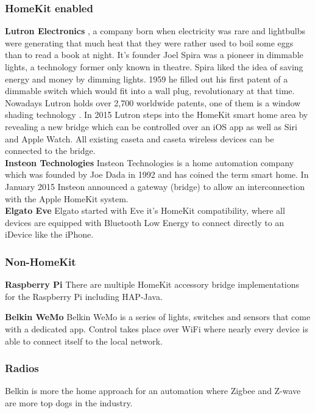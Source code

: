 			\subsubsection{HomeKit enabled}
				\textbf{Lutron Electronics}
					, a company born when electricity was rare and lightbulbs were generating that much heat that they were rather used to boil some eggs than to read a book at night. It's founder Joel Spira was a pioneer in dimmable lights, a technology former only known in theatre. Spira liked the idea of saving energy and money by dimming lights. 1959 he filled out his first patent of a dimmable switch which would fit into a wall plug, revolutionary at that time. Nowadays Lutron holds over 2,700 worldwide patents, one of them is a window shading technology \parencite{lutron}. In 2015 Lutron steps into the HomeKit smart home area by revealing a new bridge which can be controlled over an iOS app as well as Siri and Apple Watch. All existing caseta and caseta wireless devices can be connected to the bridge.\\

				\textbf{Insteon Technologies}
					Insteon Technologies is a home automation company which was founded by Joe Dada in 1992 and has coined the term smart home. In January 2015 Insteon announced a gateway (bridge) to allow an interconnection with the Apple HomeKit system.\\

				\textbf{Elgato Eve}
					Elgato started with Eve it's HomeKit compatibility, where all devices are equipped with Bluetooth Low Energy to connect directly to an iDevice like the iPhone.\\

			\subsubsection{Non-HomeKit}
				\textbf{Raspberry Pi}
					There are multiple HomeKit accessory bridge implementations for the Raspberry Pi including HAP-Java.

				\textbf{Belkin WeMo}
					Belkin WeMo is a series of lights, switches and sensors that come with a dedicated app. Control takes place over WiFi where nearly every device is able to connect itself to the local network.\\

			\subsubsection{Radios}
				Belkin is more the home approach for an automation where Zigbee and Z-wave are more top dogs in the industry.

